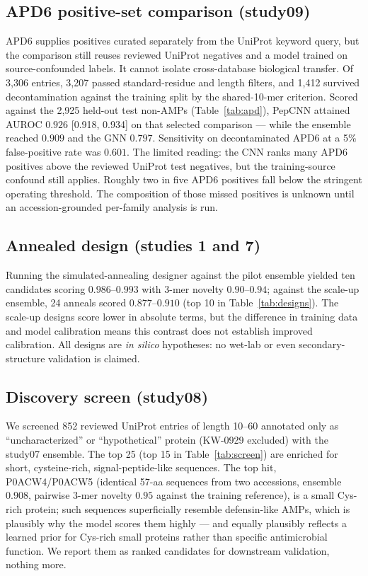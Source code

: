 \subsection{APD6 positive-set comparison (study09)}
APD6 supplies positives curated separately from the UniProt keyword query, but the comparison still reuses reviewed UniProt negatives and a model trained on source-confounded labels. It cannot isolate cross-database biological transfer. Of 3{,}306 entries, 3{,}207 passed standard-residue and
length filters, and 1{,}412 survived decontamination against the training
split by the shared-10-mer criterion. Scored against the 2{,}925 held-out
test non-AMPs (Table~\ref{tab:apd}), PepCNN attained AUROC
$0.926$ [0.918, 0.934] on that selected comparison --- while the ensemble reached $0.909$ and the GNN $0.797$.
Sensitivity on decontaminated APD6 at a 5\% false-positive rate was $0.601$.
The limited reading: the CNN ranks many APD6 positives above the reviewed
UniProt test negatives, but the training-source confound still applies. Roughly two in five APD6 positives fall below the stringent operating threshold. The composition of those missed positives is unknown until an accession-grounded per-family analysis is run.

\subsection{Annealed design (studies 1 and 7)}
Running the simulated-annealing designer against the
pilot ensemble yielded ten candidates scoring $0.986$--$0.993$ with 3-mer
novelty $0.90$--$0.94$; against the scale-up ensemble, 24 anneals scored
$0.877$--$0.910$ (top 10 in Table~\ref{tab:designs}). The scale-up designs
score lower in absolute terms, but the difference in training data and model
calibration means this contrast does not establish improved calibration. All designs are \emph{in silico} hypotheses: no
wet-lab or even secondary-structure validation is claimed.

\subsection{Discovery screen (study08)}
We screened 852 reviewed UniProt entries of length 10--60 annotated only as
``uncharacterized'' or ``hypothetical'' protein (KW-0929 excluded) with the
study07 ensemble. The top 25 (top 15 in Table~\ref{tab:screen}) are enriched
for short, cysteine-rich, signal-peptide-like sequences. The top hit,
P0ACW4/P0ACW5 (identical 57-aa sequences from two accessions, ensemble
$0.908$, pairwise 3-mer novelty $0.95$ against the training reference), is a small Cys-rich protein; such sequences
superficially resemble defensin-like AMPs, which is plausibly why the model
scores them highly --- and equally plausibly reflects a learned prior for
Cys-rich small proteins rather than specific antimicrobial function. We
report them as ranked candidates for downstream validation, nothing more.
